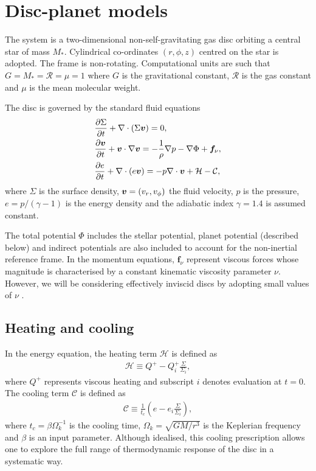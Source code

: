 \section{Disc-planet models}\label{model}
The system is a two-dimensional non-self-gravitating gas disc orbiting
a central star of mass $M_*$.  
Cylindrical
co-ordinates $(r,\phi,z)$ centred on the star is adopted. The frame is   
non-rotating. Computational units are such that 
$G=M_*=\mathcal{R}=\mu=1$ where $G$ is the gravitational constant,
$\mathcal{R}$ is the gas constant and $\mu$ is the mean molecular
weight. %

The disc is governed by the standard fluid equations  
\begin{align}\label{3d_gov_eq}
  &\frac{\p\Sigma}{\p t}+\nabla\cdot(\Sigma \bv)=0, \\
  & \frac{\p\bv}{\p t}+\bv\cdot\nabla\bv= -\frac{1}{\rho}\nabla p 
  - \nabla{\Phi} + \bm{f}_\nu,\\
  & \frac{\p e}{\p t} + \nabla\cdot(e\bv) = -p\nabla\cdot\bv +
  \mathcal{H} - \mathcal{C}, %
\end{align}
where $\Sigma$ is the surface density, $\bm{v} = (v_r,v_\phi)$ the fluid
velocity, $p$ is the pressure, $e=p/(\gamma-1)$ is the energy
density and the adiabatic index $\gamma=1.4$ is assumed constant. 

The total potential $\Phi$ includes the stellar potential, planet potential
(described below)%
and indirect potentials are also included
to account for the non-inertial reference frame. In the momentum
equations, $\bm{f}_\nu$ represent viscous forces whose magnitude is 
characterised by a constant kinematic viscosity parameter
$\nu$. However, we will be considering effectively inviscid discs by
adopting small values of $\nu$ .  

\subsection{Heating and cooling}
In the energy equation, the heating term $\mathcal{H}$ is defined as 
\begin{align}
  \mathcal{H} \equiv Q^+ - Q^+_i\frac{\Sigma}{\Sigma_i}, 
\end{align}
where $Q^+$ represents viscous heating and subscript $i$ denotes
evaluation at $t=0$. The cooling term $\mathcal{C}$ is defined as
\begin{align}
  \mathcal{C} \equiv \frac{1}{t_c}\left(e -
  e_i\frac{\Sigma}{\Sigma_i}\right),  
\end{align}
where $t_c = \beta\Omega_k^{-1}$ is the cooling time,
$\Omega_k=\sqrt{GM/r^3}$ is the Keplerian frequency and $\beta$ is an
input parameter. Although idealised, this cooling prescription allows one 
to explore the full range of thermodynamic response of the disc in a 
systematic way. 


